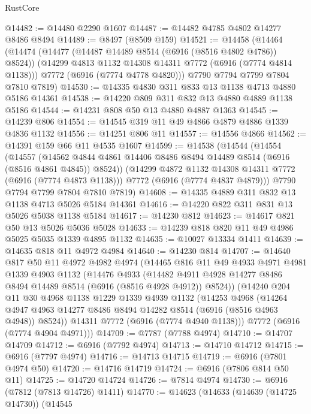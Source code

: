 \begin{lexlean}{RustCore}
\begin{coremodule}
@14482 := @14480 @2290 @1607
@14487 := @14482 @4785 @4802 @14277 @8486 @8494
@14489 := @8497 (@8509 @159)
@14521 := @14458
    (@14464
      (@14474
        (@14477 (@14487 @14489 @8514 (@6916 (@8516 @4802 @4786)) @8524))
        (@14299 @4813 @1132 @14308 @14311 @7772 (@6916 (@7774 @4814 @1138)))
        @7772
        (@6916 (@7774 @4778 @4820)))
      @7790
      @7794
      @7799
      @7804
      @7810
      @7819)
@14530 := @14335 @4830 @311 @833 @13 @1138 @4713 @4880 @5186 @14361
@14538 := @14220 @809 @311 @832 @13 @4880 @4889 @1138 @5186
@14544 := @14231 @808 @50 @13 @4880 @4887 @1363
@14545 := @14239 @806
@14554 := @14545 @319 @11 @49 @4866 @4879 @4886 @1339 @4836 @1132
@14556 := @14251 @806 @11
@14557 := @14556 @4866
@14562 := @14391 @159 @66 @11 @4535 @1607
@14599 := @14538
    (@14544
      (@14554
        (@14557
          (@14562 @4844 @4861 @14406 @8486 @8494 @14489 @8514 (@6916 (@8516 @4861 @4845)) @8524))
        (@14299 @4872 @1132 @14308 @14311 @7772 (@6916 (@7774 @4873 @1138)))
        @7772
        (@6916 (@7774 @4837 @4879)))
      @7790
      @7794
      @7799
      @7804
      @7810
      @7819)
@14608 := @14335 @4889 @311 @832 @13 @1138 @4713 @5026 @5184 @14361
@14616 := @14220 @822 @311 @831 @13 @5026 @5038 @1138 @5184
@14617 := @14230 @812
@14623 := @14617 @821 @50 @13 @5026 @5036 @5028
@14633 := @14239 @818 @820 @11 @49 @4986 @5025 @5035 @1339 @4895 @1132
@14635 := @10027 @13334 @1411
@14639 := @14635 @818 @11 @4972 @4984
@14640 := @14230 @814
@14707 := @14640
    @817
    @50
    @11
    @4972
    @4982
    @4974
    (@14465
      @816
      @11
      @49
      @4933
      @4971
      @4981
      @1339
      @4903
      @1132
      (@14476
        @4933
        (@14482 @4911 @4928 @14277 @8486 @8494 @14489 @8514 (@6916 (@8516 @4928 @4912)) @8524))
      (@14240
        @204
        @11
        @30
        @4968
        @1138
        @1229
        @1339
        @4939
        @1132
        (@14253
          @4968
          (@14264 @4947 @4963 @14277 @8486 @8494 @14282 @8514 (@6916 (@8516 @4963 @4948)) @8524))
        @14311
        @7772
        (@6916 (@7774 @4940 @1138)))
      @7772
      (@6916 (@7774 @4904 @4971)))
@14709 := @7787 (@7788 @4974)
@14710 := @14707 @14709
@14712 := @6916 (@7792 @4974)
@14713 := @14710 @14712
@14715 := @6916 (@7797 @4974)
@14716 := @14713 @14715
@14719 := @6916 (@7801 @4974 @50)
@14720 := @14716 @14719
@14724 := @6916 (@7806 @814 @50 @11)
@14725 := @14720 @14724
@14726 := @7814 @4974
@14730 := @6916 (@7812 (@7813 @14726) @1411)
@14770 := @14623
    (@14633
      (@14639 (@14725 @14730))
      (@14545

\end{coremodule}
\end{lexlean}
